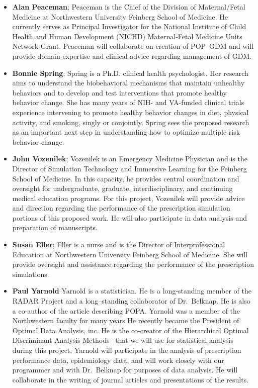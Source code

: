 \begin{itemize}
\item\textbf{Alan Peaceman}; Peaceman is the Chief of the Division of
  Maternal/Fetal Medicine at Northwestern University Feinberg School
  of Medicine.  He currently serves as Principal Investigator for the
  National Institute of Child Health and Human Development (NICHD)
  Maternal-Fetal Medicine Units Network Grant. Peaceman will
  collaborate on creation of POP–GDM and will provide domain expertise
  and clinical advice regarding management of GDM.

\item\textbf{Bonnie Spring}; Spring is a Ph.D. clinical health
  psychologist. Her research aims to understand the biobehavioral
  mechanisms that maintain unhealthy behaviors and to develop and test
  interventions that promote healthy behavior change. She has many
  years of NIH- and VA-funded clinical trials experience intervening
  to promote healthy behavior changes in diet, physical activity, and
  smoking, singly or conjointly. Spring sees the proposed research as
  an important next step in understanding how to optimize multiple
  risk behavior change.

\item\textbf{John Vozenilek}; Vozenilek is an Emergency Medicine
  Physician and is the Director of Simulation Technology and Immersive
  Learning for the Feinberg School of Medicine. In this capacity, he
  provides central coordination and oversight for undergraduate,
  graduate, interdisciplinary, and continuing medical education
  programs. For this project, Vozenilek will provide advice and
  direction regarding the performance of the prescription simulation
  portions of this proposed work. He will also participate in data
  analysis and preparation of manuscripts.

\item\textbf{Susan Eller}; Eller is a nurse and is the Director of
  Interprofessional Education at Northwestern University Feinberg
  School of Medicine. She will provide oversight and assistance
  regarding the performance of the prescription simulations.

\item\textbf{Paul Yarnold} Yarnold is a statistician. He is a
  long-standing member of the RADAR Project and a long–standing
  collaborator of Dr.\ Belknap. He is also a co-author of the article
  describing POPA. Yarnold was a member of the Northwestern faculty
  for many years He recently became the President of Optimal Data
  Analysis, inc. He is the co-creator of the Hierarchical Optimal
  Discriminant Analysis Methods~\citep{Yarnold2004} that we will use
  for statistical analysis during this project. Yarnold will
  participate in the analysis of prescription performance data,
  epidemiology data, and will work closely with our programmer and
  with Dr.\ Belknap for purposes of data analysis. He will collaborate
  in the writing of journal articles and presentations of the results.
\end{itemize}

